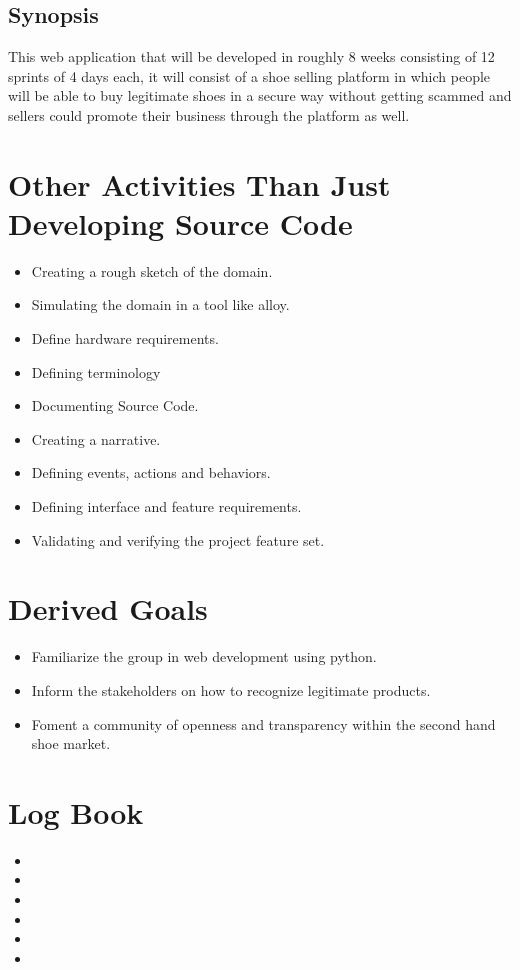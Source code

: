 \subsection{Synopsis}
This web application that will be developed in roughly 8 weeks consisting of 12 sprints of 4 days each, it will consist of a shoe selling platform in which people will be able to buy legitimate shoes in a secure way without getting scammed and sellers could promote their business through the platform as well.
\section{Other Activities Than Just Developing Source Code}
\begin{itemize}
  \item Creating a rough sketch of the domain.
  \item Simulating the domain in a tool like alloy.
  \item Define hardware requirements.
  \item Defining terminology
  \item Documenting Source Code.
  \item Creating a narrative.
  \item Defining events, actions and behaviors.
  \item Defining interface and feature requirements.
  \item Validating and verifying the project feature set.
\end{itemize}
\section{Derived Goals}
\begin{itemize}
  \item Familiarize the group in web development using python.
  \item Inform the stakeholders on how to recognize legitimate products.
  \item Foment a community of openness and transparency within the second hand shoe market.
\end{itemize}
\section{Log Book}
\begin{itemize}
  \item {}
  \item {}
  \item {}
  \item {}
  \item {}
  \item {}
\end{itemize}
